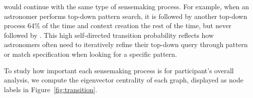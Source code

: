  would continue with the same type of sensemaking process.
 For example, when an astronomer performs top-down pattern search,
 it is followed by another top-down process 64\% of the time and context creation the rest of the time,
 but never followed by .
 This high self-directed transition probability
 reflects how astronomers often need to iteratively
 refine their top-down query through pattern
 or match specification when looking for a specific pattern. %
 \par To study how important each sensemaking process
 is for participant's overall analysis,
 we compute the eigenvector centrality of each graph,
 displayed as node labels in Figure~\ref{fig:transition}.
